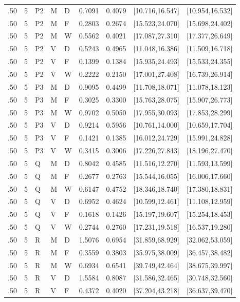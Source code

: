 {\begin{longtable}{rrlllrrll}
.50 & 5 & P2 & M & D & 0.7091 & 0.4079 & [10.716,16.547] & [10.954,16.532]\\
.50 & 5 & P2 & M & F & 0.2803 & 0.2674 & [15.523,24.070] & [15.698,24.402]\\
.50 & 5 & P2 & M & W & 0.5562 & 0.4021 & [17.087,27.310] & [17.377,26.649]\\
.50 & 5 & P2 & V & D & 0.5243 & 0.4965 & [11.048,16.386] & [11.509,16.718]\\
.50 & 5 & P2 & V & F & 0.1399 & 0.1384 & [15.935,24.493] & [15.533,24.355]\\
.50 & 5 & P2 & V & W & 0.2222 & 0.2150 & [17.001,27.408] & [16.739,26.914]\\
.50 & 5 & P3 & M & D & 0.9095 & 0.4499 & [11.708,18.071] & [11.078,18.123]\\
.50 & 5 & P3 & M & F & 0.3025 & 0.3300 & [15.763,28.075] & [15.907,26.773]\\
.50 & 5 & P3 & M & W & 0.9702 & 0.5050 & [17.955,30.093] & [17.853,28.299]\\
.50 & 5 & P3 & V & D & 0.9214 & 0.5956 & [10.761,14.000] & [10.659,17.704]\\
.50 & 5 & P3 & V & F & 0.1421 & 0.1385 & [16.012,24.729] & [15.991,24.828]\\
.50 & 5 & P3 & V & W & 0.3415 & 0.3006 & [17.226,27.843] & [18.196,27.470]\\
.50 & 5 & Q & M & D & 0.8042 & 0.4585 & [11.516,12.270] & [11.593,13.599]\\
.50 & 5 & Q & M & F & 0.2677 & 0.2763 & [15.544,16.055] & [16.006,17.660]\\
.50 & 5 & Q & M & W & 0.6147 & 0.4752 & [18.346,18.740] & [17.380,18.831]\\
.50 & 5 & Q & V & D & 0.6952 & 0.4624 & [10.599,12.461] & [11.108,12.959]\\
.50 & 5 & Q & V & F & 0.1618 & 0.1426 & [15.197,19.607] & [15.254,18.453]\\
.50 & 5 & Q & V & W & 0.2744 & 0.2760 & [17.231,19.518] & [16.537,19.280]\\
.50 & 5 & R & M & D & 1.5076 & 0.6954 & [31.859,68.929] & [32.062,53.059]\\
.50 & 5 & R & M & F & 0.3559 & 0.3803 & [35.975,38.009] & [36.457,38.482]\\
.50 & 5 & R & M & W & 0.6934 & 0.6541 & [39.749,42.464] & [38.675,39.997]\\
.50 & 5 & R & V & D & 1.5584 & 0.8087 & [31.586,32.465] & [30.748,32.560]\\
.50 & 5 & R & V & F & 0.4372 & 0.4020 & [37.204,43.218] & [36.637,39.470]\\

\end{longtable}}
